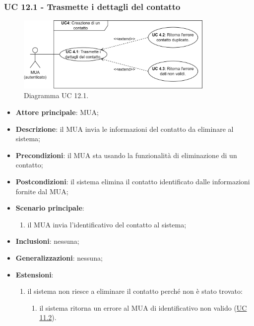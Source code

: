 \subsubsection{UC 12.1 - Trasmette i dettagli del contatto} \label{sec:UC12.1}
    \begin{figure}[h]
        \includegraphics[width=0.85\textwidth]{sections/uc_imgs/UC04.X.png}
        \centering
        \caption{Diagramma UC 12.1.}
    \end{figure}
    \begin{itemize}
        \item \textbf{Attore principale}: MUA;
        \item \textbf{Descrizione}: il MUA invia le informazioni del contatto da eliminare al sistema;
        \item \textbf{Precondizioni}: il MUA sta usando la funzionalità di eliminazione di un contatto;
        \item \textbf{Postcondizioni}: il sistema elimina il contatto identificato dalle informazioni fornite dal MUA;
        \item \textbf{Scenario principale}:
            \begin{enumerate}
                \item il MUA invia l'identificativo del contatto al sistema;
            \end{enumerate}
        \item \textbf{Inclusioni}: nessuna;
        \item \textbf{Generalizzazioni}: nessuna;
        \item \textbf{Estensioni}:
            \begin{enumerate}[label=\alph*.]
                \item il sistema non riesce a eliminare il contatto perché non è stato trovato:
                \begin{enumerate}[label=\arabic*.]
                    \item il sistema ritorna un errore al MUA di identificativo non valido (\hyperref[sec:UC11.2]{UC 11.2}).
                \end{enumerate}
            \end{enumerate}
    \end{itemize}


